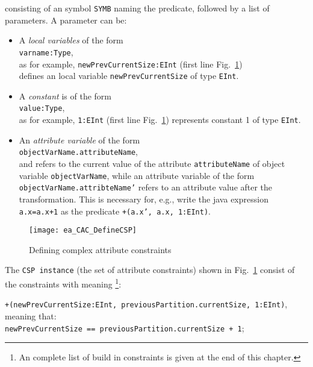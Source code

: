 \noindent consisting of an symbol \texttt{SYMB} naming the predicate, followed by a list of parameters. A parameter can be:
\begin{itemize}
    \item A \emph{local variables} of the form \\
    \hspace*{0.5cm} \texttt{varname:Type},\\
    as for example, \texttt{newPrevCurrentSize:EInt} (first line Fig.~\ref{ea:ea_CAC_DefineCSP})\\
     defines an local variable \texttt{newPrevCurrentSize} of type \texttt{EInt}. 
    \item A \emph{constant} is of the form \\
    \hspace*{0.5cm} \texttt{value:Type},\\
    as for example, \texttt{1:EInt} (first line Fig.~\ref{ea:ea_CAC_DefineCSP}) represents constant 1 of type \texttt{EInt}.
    \item An \emph{attribute variable} of the form \\
    \hspace*{0.5cm}\texttt{objectVarName.attributeName}, \\
     and refers to the current value of the attribute \texttt{attributeName} of object variable 	\texttt{objectVarName}, while an attribute variable of the form \texttt{objectVarName.attribteName'} refers to an attribute value after the transformation. This is necessary for, 	e.g., write the java expression \texttt{a.x=a.x+1} as the predicate \texttt{+(a.x', a.x, 1:EInt)}. 
\end{itemize}


 
\begin{figure}[htbp]
\begin{center}
  \texttt{[image: ea\_CAC\_DefineCSP]}
  \caption{Defining complex attribute constraints}  
  \label{ea:ea_CAC_DefineCSP}
\end{center}
\end{figure}

The \texttt{CSP instance} (the set of attribute constraints) shown in Fig.~\ref{ea:ea_CAC_DefineCSP} consist of the constraints with meaning \footnote{An complete list of build in constraints is given at the end of this chapter.}:

\hspace*{0.5cm}\texttt{\small +(newPrevCurrentSize:EInt, previousPartition.currentSize, 1:EInt)},\\
meaning that:\\
\hspace*{0.5cm}\texttt{\small newPrevCurrentSize == previousPartition.currentSize + 1};

